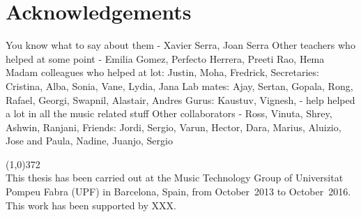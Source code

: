 \chapter*{Acknowledgements}

You know what to say about them - Xavier Serra, Joan Serra
Other teachers who helped at some point -  Emilia Gomez, Perfecto Herrera, Preeti Rao, Hema Madam
colleagues who helped at lot: Justin, Moha, Fredrick,
Secretaries: Cristina, Alba, Sonia, Vane, Lydia, Jana
Lab mates: Ajay, Sertan, Gopala, Rong, Rafael, Georgi, Swapnil, Alastair, Andres
Gurus:  Kaustuv, Vignesh, -  help helped a lot in all the music related stuff
Other collaborators - Ross, Vinuta, Shrey, Ashwin, Ranjani, 
Friends: Jordi, Sergio, Varun, Hector, Dara, Marius, Aluizio, Jose and Paula, Nadine, Juanjo, Sergio

\vspace*{\fill}

\line(1,0){372}\\
\footnotesize
This thesis has been carried out at the Music Technology Group of Universitat Pompeu Fabra (UPF) in Barcelona, Spain, from October~2013 to October~2016. This work has been supported by XXX.
\normalsize
